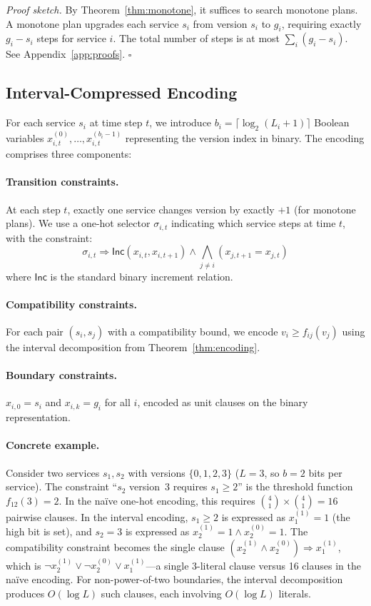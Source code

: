 \documentclass[10pt,twocolumn]{article}
\begin{document}
\emph{Proof sketch.}
By Theorem~\ref{thm:monotone}, it suffices to search monotone
plans. A monotone plan upgrades each service $s_i$ from version
$s_i$ to $g_i$, requiring exactly $g_i - s_i$ steps for service
$i$. The total number of steps is at most
$\sum_i (g_i - s_i)$. See Appendix~\ref{app:proofs}.
\hfill$\square$

\subsection{Interval-Compressed Encoding}
\label{sec:encoding}

For each service $s_i$ at time step $t$, we introduce
$b_i = \lceil \log_2(L_i + 1) \rceil$ Boolean variables
$x_{i,t}^{(0)}, \ldots, x_{i,t}^{(b_i - 1)}$ representing
the version index in binary. The encoding comprises three
components:

\paragraph{Transition constraints.}
At each step $t$, exactly one service changes version by
exactly $+1$ (for monotone plans). We use a one-hot selector
$\sigma_{i,t}$ indicating which service steps at time $t$,
with the constraint:
\[
  \sigma_{i,t} \Rightarrow \mathsf{Inc}(x_{i,t}, x_{i,t+1})
  \land \bigwedge_{j \neq i} (x_{j,t+1} = x_{j,t})
\]
where $\mathsf{Inc}$ is the standard binary increment relation.

\paragraph{Compatibility constraints.}
For each pair $(s_i, s_j)$ with a compatibility bound, we
encode $v_i \geq f_{ij}(v_j)$ using the interval decomposition
from Theorem~\ref{thm:encoding}.

\paragraph{Boundary constraints.}
$x_{i,0} = s_i$ and $x_{i,k} = g_i$ for all $i$, encoded
as unit clauses on the binary representation.

\paragraph{Concrete example.}
Consider two services $s_1, s_2$ with versions $\{0, 1, 2, 3\}$
($L = 3$, so $b = 2$ bits per service). The constraint
``$s_2$ version~3 requires $s_1 \geq 2$'' is the threshold
function $f_{12}(3) = 2$. In the na\"ive one-hot encoding, this
requires $\binom{4}{1} \times \binom{4}{1} = 16$ pairwise
clauses. In the interval encoding, $s_1 \geq 2$ is expressed
as $x_{1}^{(1)} = 1$ (the high bit is set), and $s_2 = 3$
is expressed as $x_{2}^{(1)} = 1 \land x_{2}^{(0)} = 1$.
The compatibility constraint becomes the single clause
$(x_{2}^{(1)} \land x_{2}^{(0)}) \Rightarrow x_{1}^{(1)}$,
which is $\neg x_{2}^{(1)} \lor \neg x_{2}^{(0)} \lor x_{1}^{(1)}$---a
single 3-literal clause versus 16 clauses in the na\"ive encoding.
For non-power-of-two boundaries, the interval decomposition
produces $O(\log L)$ such clauses, each involving $O(\log L)$
literals.
\end{document}
